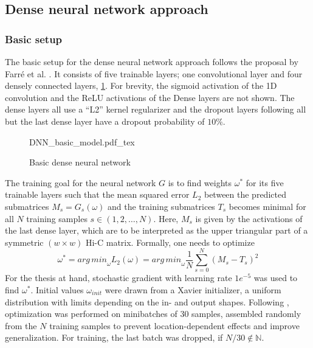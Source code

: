 \subsection{Dense neural network approach}

\subsubsection{Basic setup} \label{sec:methods:basicSetup}
The basic setup for the dense neural network approach follows the proposal by Farr\'e et al. \cite{Farre2018a}.
It consists of five trainable layers; one convolutional layer and four densely connected layers, \cref{fig:methods:basic_dnn}.
For brevity, the sigmoid activation of the 1D convolution and the ReLU activations of the Dense layers are not shown.
The dense layers all use a ``L2'' kernel regularizer and the dropout layers following all but the last dense layer have a dropout probability of $10\%$.
\begin{figure}[htb]
    \small
    \centering
    {DNN_basic_model.pdf_tex}
    \caption{Basic dense neural network}
    \label{fig:methods:basic_dnn}
\end{figure}

The training goal for the neural network $G$ is to find weights $\omega^*$ for its five trainable layers 
such that the mean squared error $L_2$ between the predicted submatrices $M_s = G_s(\omega)$ 
and the training submatrices $T_s$ becomes minimal for all $N$ training samples $s \in (1,2,\dots, N)$. 
Here, $M_s$ is given by the activations of the last dense layer, which are to be interpreted as the upper triangular 
part of a symmetric $(w\times w)$ Hi-C matrix.
Formally, one needs to optimize
\begin{equation}
 \omega^* = \mathit{arg\,min}_\omega L_2(\omega) = \mathit{arg\,min}_\omega \frac{1}{N} \sum_{s=0}^N (M_s - T_s)^2 \label{eq:methods:nn-mse}
\end{equation} 
For the thesis at hand, stochastic gradient with learning rate $1e^{-5}$  was used to find $\omega^*$.
Initial values $\omega_\mathit{init}$ were drawn from a Xavier initializer, a uniform distribution with limits depending on the in- and output shapes.
Following \cite{Farre2018a}, optimization was performed on minibatches of 30 samples, assembled randomly from the $N$ training samples
to prevent location-dependent effects and improve generalization.
For training, the last batch was dropped, if $N/30 \not \in \mathbb{N}$. 


